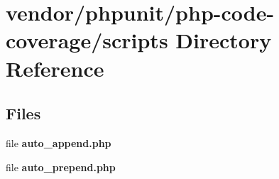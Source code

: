\section{vendor/phpunit/php-\/code-\/coverage/scripts Directory Reference}
\label{dir_331038068aff7f282e9e885bd2c12488}
\subsection*{Files}
\begin{DoxyCompactItemize}
\item 
file {\bf auto\+\_\+append.\+php}
\item 
file {\bf auto\+\_\+prepend.\+php}
\end{DoxyCompactItemize}
